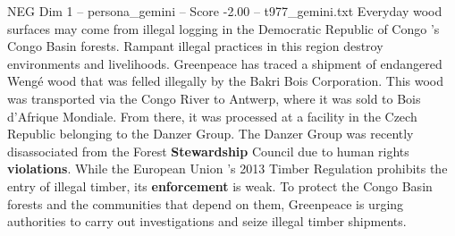 \begin{textsample}{NEG Dim 1 – persona\_gemini – Score -2.00 – t977\_gemini.txt}  \label{ex:f1_neg_009}
Everyday wood surfaces may come from illegal logging in the Democratic Republic of Congo 's Congo Basin forests.
Rampant illegal practices in this region destroy environments and livelihoods.
Greenpeace has traced a shipment of endangered Wengé wood that was felled illegally by the Bakri Bois Corporation.
This wood was transported via the Congo River to Antwerp, where it was sold to Bois d’Afrique Mondiale.
From there, it was processed at a facility in the Czech Republic belonging to the Danzer Group.
The Danzer Group was recently disassociated from the Forest \textbf{Stewardship} Council due to human rights \textbf{violations}.
While the European Union 's 2013 Timber Regulation prohibits the entry of illegal timber, its \textbf{enforcement} is weak.
To protect the Congo Basin forests and the communities that depend on them, Greenpeace is urging authorities to carry out investigations and seize illegal timber shipments.

\end{textsample}
